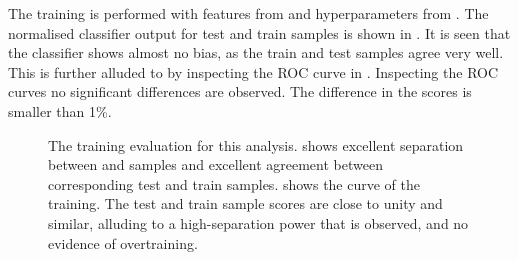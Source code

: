 The training is performed with features from  and hyperparameters from .
The normalised classifier output for test and train samples is shown in .
It is seen that the classifier shows almost no bias, as the train and test samples agree very well.
This is further alluded to by inspecting the ROC curve in .
Inspecting the ROC curves no significant differences are observed.
The difference in the \AUC scores is smaller than 1\%.
\begin{figure}[htbp!]
    \centering
    \caption{\label{fig:training_evaluation} The training evaluation for this analysis.
     shows excellent separation between \epem\ra\qqbar and \BtoXsgamma samples and excellent agreement between corresponding test and train samples.
     shows the \ROC curve of the training. 
    The test and train sample \AUC scores are close to unity and similar, alluding to a high-separation power that is observed, and no evidence of overtraining.
    }
\end{figure}

